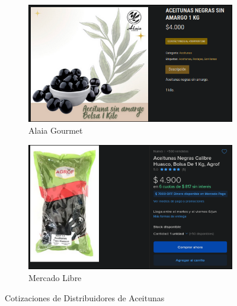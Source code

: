 \documentclass[12pt]{article}
\begin{document}
        \begin{figure}[H] %
            \centering
            \begin{subfigure}{0.45\textwidth}
                \centering
                \includegraphics[width=0.9\linewidth]{gourmet} %
                \caption{Alaia Gourmet}
                \label{fig:alaia_gourmet_aceitunas}
            \end{subfigure}
            \hfill
            \begin{subfigure}{0.4\textwidth}
                \centering
                \includegraphics[width=0.9\linewidth]{libre} %
                \caption{Mercado Libre}
                \label{fig:mercado_libre_aceitunas}
            \end{subfigure}
            \caption{Cotizaciones de Distribuidores de Aceitunas}
            \label{fig:cotizaciones_aceitunas}
        \end{figure} %
\end{document}
